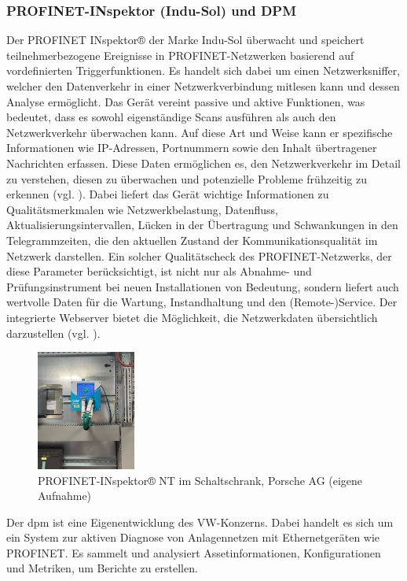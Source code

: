 \subsubsection{PROFINET-INspektor (Indu-Sol) und DPM}

 Der PROFINET INspektor® der Marke Indu-Sol überwacht und speichert teilnehmerbezogene Ereignisse in PROFINET-Netzwerken basierend auf vordefinierten Triggerfunktionen. Es handelt sich dabei um einen Netzwerksniffer, welcher den Datenverkehr in einer Netzwerkverbindung mitlesen kann und dessen Analyse ermöglicht. Das Gerät vereint passive und aktive Funktionen, was bedeutet, dass es sowohl eigenständige Scans ausführen als auch den Netzwerkverkehr überwachen kann. \clearpage \noindent Auf diese Art und Weise kann er spezifische Informationen wie IP-Adressen, Portnummern sowie den Inhalt übertragener Nachrichten erfassen. Diese Daten ermöglichen es, den Netzwerkverkehr im Detail zu verstehen, diesen zu überwachen und potenzielle Probleme frühzeitig zu erkennen (vgl. \cite{luber}). Dabei liefert das Gerät wichtige Informationen zu Qualitätsmerkmalen wie Netzwerkbelastung, Datenfluss, Aktualisierungsintervallen, Lücken in der Übertragung und Schwankungen in den Telegrammzeiten, die den aktuellen Zustand der Kommunikationsqualität im Netzwerk darstellen. Ein solcher Qualitätscheck des PROFINET-Netzwerks, der diese Parameter berücksichtigt, ist nicht nur als Abnahme- und Prüfungsinstrument bei neuen Installationen von Bedeutung, sondern liefert auch wertvolle Daten für die Wartung, Instandhaltung und den (Remote-)Service. Der integrierte Webserver bietet die Möglichkeit, die Netzwerkdaten übersichtlich darzustellen (vgl. \cite{InduSol}).
\begin{figure}[H]
    \centering
    \includegraphics[width=0.29\textwidth]{images/PROFINET-INspektor.jpg}
    \caption{PROFINET-INspektor® NT im Schaltschrank, Porsche AG (eigene Aufnahme)}
    \label{fig:PROFINET-INspektor® NT}
\end{figure} 
Der \ac{dpm} ist eine Eigenentwicklung des VW-Konzerns. Dabei handelt es sich um ein System zur aktiven Diagnose von Anlagennetzen mit Ethernetgeräten wie PROFINET. Es sammelt und analysiert Assetinformationen, Konfigurationen und Metriken, um Berichte zu erstellen. 
